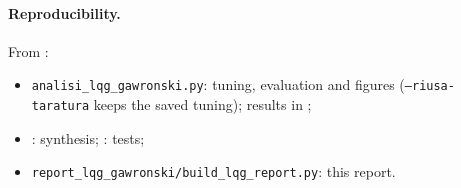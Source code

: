 \documentclass[10pt,a4paper]{article}
\numberwithin{equation}{section}
\begin{document}
\paragraph{Reproducibility.} From :
\begin{itemize}
\item \texttt{analisi\_lqg\_gawronski.py}: tuning, evaluation and figures (\texttt{--riusa-taratura} keeps the saved tuning); results in ;
\item {}: synthesis; : tests;
\item \texttt{report\_lqg\_gawronski/build\_lqg\_report.py}: this report.
\end{itemize}
\end{document}

